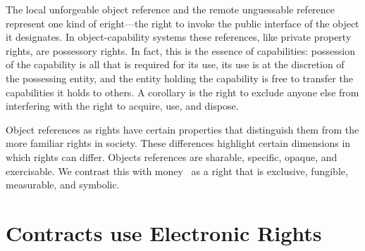 \documentclass{llncs}
\begin{document}
The local unforgeable object reference and the remote unguessable reference represent one kind of eright---the right to invoke the public interface of the object it designates. In object-capability systems these references, like private property rights, are possessory rights. In fact, this is the essence of capabilities: possession of the capability is all that is required for its use, its use is at the discretion of the possessing entity, and the entity holding the capability is free to transfer the capabilities it holds to others. A corollary is the right to exclude anyone else from interfering with the right to acquire, use, and dispose.

Object references as rights have certain properties that distinguish them from the more familiar rights in society. These differences highlight certain dimensions in which rights can differ. Objects references are sharable, specific, opaque, and exercisable. We contrast this with money~\cite{fox2011property} as a right that is exclusive, fungible, measurable, and symbolic.


\section{Contracts use Electronic Rights}
\end{document}
